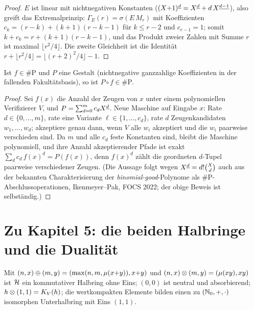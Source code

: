 \begin{proof}
$E$ ist linear mit nichtnegativen Konstanten
($(X{+}1)^{\underline{d}}=X^{\underline{d}}+d\,X^{\underline{d-1}}$), also greift das
Extremalprinzip: $\Gamma_E(r)=\sigma(E\,M_r)$ mit Koeffizienten
$c_k=(r{-}k)+(k{+}1)(r{-}k{-}1)$ für $k\le r{-}2$ und $c_{r-1}=1$;
somit $k+c_k=r+(k{+}1)(r{-}k{-}1)$, und das Produkt zweier Zahlen
mit Summe $r$ ist maximal $\lfloor r^2/4\rfloor$. Die zweite
Gleichheit ist die Identität
$r+\lfloor r^2/4\rfloor=\lfloor(r{+}2)^2/4\rfloor-1$.
\end{proof}

\begin{satz}
Ist $f\in\#\mathrm P$ und $P$ eine Gestalt (nichtnegative
ganzzahlige Koeffizienten in der fallenden Fakultätsbasis), so ist
$P\circ f\in\#\mathrm P$.
\end{satz}

\begin{proof}
Sei $f(x)$ die Anzahl der Zeugen von $x$ unter einem polynomiellen
Verifizierer $V$, und $P=\sum_{d=0}^m c_dX^{\underline{d}}$. Neue Maschine auf
Eingabe $x$: Rate $d\in\{0,\ldots,m\}$, rate eine Variante
$\ell\in\{1,\ldots,c_d\}$, rate $d$ Zeugenkandidaten
$w_1,\ldots,w_d$; akzeptiere genau dann, wenn $V$ alle $w_i$
akzeptiert und die $w_i$ paarweise verschieden sind. Da $m$ und
alle $c_d$ feste Konstanten sind, bleibt die Maschine polynomiell,
und ihre Anzahl akzeptierender Pfade ist exakt
$\sum_d c_d\,f(x)^{\underline d}=P(f(x))$, denn
$f(x)^{\underline d}$ zählt die geordneten $d$-Tupel paarweise
verschiedener Zeugen. (Die Aussage folgt wegen
$X^{\underline{d}}=d!\binom Xd$ auch aus der bekannten Charakterisierung der
\emph{binomial-good}-Polynome als \#P-Abschlussoperationen,
Ikenmeyer--Pak, FOCS 2022; der obige Beweis ist selbständig.)
\end{proof}

\section*{Zu Kapitel 5: die beiden Halbringe und die Dualität}

\begin{satz}
Mit $(n,x)\oplus(m,y)=(\max(n,m,\mu(x{+}y)),x{+}y)$ und
$(n,x)\otimes(m,y)=(\mu(xy),xy)$ ist $\mathcal H$ ein kommutativer
Halbring ohne Eins; $(0,0)$ ist neutral und absorbierend;
$h\otimes(1,1)=K_V(h)$; die wertkompakten Elemente bilden einen zu
$(\mathbb N_0,+,\cdot)$ isomorphen Unterhalbring mit Eins $(1,1)$.
\end{satz}


